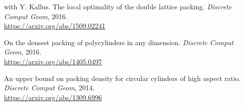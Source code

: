 \documentclass[10pt]{article}
\newenvironment{innerlist}[1][\enskip\textbullet]%
        {\begin{compactitem}[#1]}{\end{compactitem}}
\begin{document}
\begin{innerlist}[-]
%
\item with Y. Kallus. The local optimality of the double lattice packing. \emph{Discrete Comput Geom}, %
2016.\\
\href{https://arxiv.org/abs/1509.02241}{https://arxiv.org/abs/1509.02241} 
%
\item On the densest packing of polycylinders in any dimension. \emph{Discrete Comput Geom}, %
2016.\\
\href{https://arxiv.org/abs/1405.0497}{https://arxiv.org/abs/1405.0497} 
\item An upper bound on packing density for circular cylinders of high aspect ratio. \emph{Discrete Comput Geom}, %
2014.\\
\href{https://arxiv.org/abs/1309.6996}{https://arxiv.org/abs/1309.6996}

\end{innerlist} %
\end{document}
